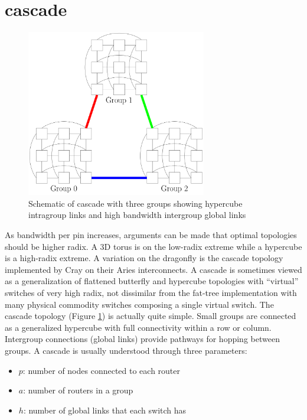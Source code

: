 
\section{cascade}
\label{sec:tutorial:cascade}

\begin{figure}[h!]
\centering
\includegraphics[width=0.7\textwidth]{figures/tikz/cascade/cascade.png}
\caption{Schematic of cascade with three groups showing hypercube intragroup links and high bandwidth intergroup global links}
\label{fig:topologies:cascade}
\end{figure}

As bandwidth per pin increases, arguments can be made that optimal topologies should be higher radix.
A 3D torus is on the low-radix extreme while a hypercube is a high-radix extreme.
A variation on the dragonfly is the cascade topology implemented by Cray on their Aries interconnects.
A cascade is sometimes viewed as a generalization of flattened butterfly and hypercube topologies with ``virtual'' switches of very high radix,
not dissimilar from the fat-tree implementation with many physical commodity switches composing a single virtual switch.
The cascade topology (Figure \ref{fig:topologies:cascade}) is actually quite simple.
Small groups are connected as a generalized hypercube with full connectivity within a row or column.
Intergroup connections (global links) provide pathways for hopping between groups.
A cascade is usually understood through three parameters:
\begin{itemize}
\item $p$: number of nodes connected to each router
\item $a$: number of routers in a group
\item $h$: number of global links that each switch has
\end{itemize}

